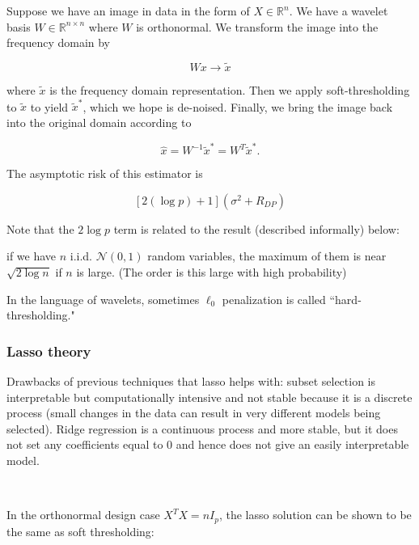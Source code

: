 \begin{example} Suppose we have an image in data in the form of \(X \in \mathbb{R}^n\). We have a wavelet basis \(W \in \mathbb{R}^{n \times n}\) where \(W\) is orthonormal. We transform the image into the frequency domain by

\[
W x \to \tilde{x}
\]

where \(\tilde{x}\) is the frequency domain representation. Then we apply soft-thresholding to \(\tilde{x}\) to yield \(\tilde{x}^*\), which we hope is de-noised. Finally, we bring the image back into the original domain according to

\[
\hat{x} = W^{-1}\tilde{x}^* = W^T \tilde{x}^*.
\]

\end{example}

The asymptotic risk of this estimator is 

\[
[2(\log p) + 1](\sigma^2 + R_{DP})
\]

Note that the \(2 \log p\) term is related to the result (described informally) below:

\begin{proposition}
if we have \(n\) i.i.d. \(\mathcal{N}(0,1)\) random variables, the maximum of them is near \(\sqrt{2 \log n}\) if \(n\) is large. (The order is this large with high probability)
\end{proposition}

\begin{remark} In the language of wavelets, sometimes \(\ell_0\) penalization is called ``hard-thresholding."

\end{remark}

\subsubsection{Lasso theory}

Drawbacks of previous techniques that lasso helps with: subset selection is interpretable but computationally intensive and not stable because it is a discrete process (small changes in the data can result in very different models being selected). Ridge regression is a continuous process and more stable, but it does not set any coefficients equal to 0 and hence does not give an easily interpretable model.

\

In the orthonormal design case \(X^T X = n I_p\), the lasso solution can be shown to be the same as soft thresholding:

